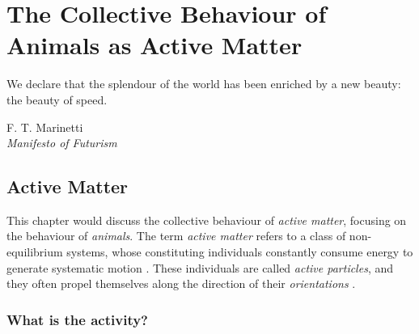 \documentclass[11pt,twoside]{report}
\begin{document}
\chapter{The Collective Behaviour of Animals as Active Matter}
\label{chapter:collective_behaviour}

\epigraph{We declare that the splendour of the world has been enriched by a new beauty: the beauty of speed.}{F. T. Marinetti\\ \emph{Manifesto of Futurism}}

\section{Active Matter}
\label{section:active-matter}

This chapter would discuss the collective behaviour of \emph{active matter}, focusing on the behaviour of \emph{animals}.
The term \emph{active matter} refers to a class of non-equilibrium systems, whose constituting individuals constantly consume energy to generate systematic motion \cite{ramaswamy2017}. These individuals are called \emph{active particles}, and they often propel themselves along the direction of their \emph{orientations} \cite{romanczuk2012}.


\subsection{What is the activity?}


\end{document}
